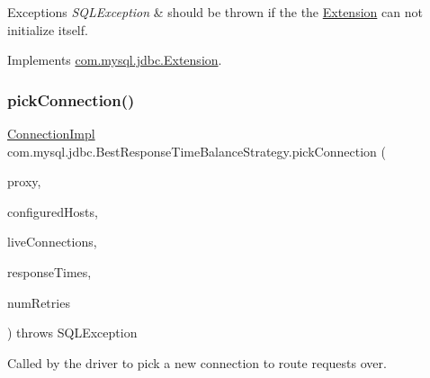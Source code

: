 \begin{DoxyExceptions}{Exceptions}
{\em S\+Q\+L\+Exception} & should be thrown if the the \mbox{\hyperlink{interfacecom_1_1mysql_1_1jdbc_1_1_extension}{Extension}} can not initialize itself. \\
\hline
\end{DoxyExceptions}


Implements \mbox{\hyperlink{interfacecom_1_1mysql_1_1jdbc_1_1_extension_a79427811058193260bd4df0c38414e88}{com.\+mysql.\+jdbc.\+Extension}}.

\mbox{\label{classcom_1_1mysql_1_1jdbc_1_1_best_response_time_balance_strategy_ad59590e6022784ddedcfb060173aed21}} 
\subsubsection{\texorpdfstring{pick\+Connection()}{pickConnection()}}
{\footnotesize\ttfamily \mbox{\hyperlink{classcom_1_1mysql_1_1jdbc_1_1_connection_impl}{Connection\+Impl}} com.\+mysql.\+jdbc.\+Best\+Response\+Time\+Balance\+Strategy.\+pick\+Connection (\begin{DoxyParamCaption}\item[{\mbox{\hyperlink{classcom_1_1mysql_1_1jdbc_1_1_load_balanced_connection_proxy}{Load\+Balanced\+Connection\+Proxy}}}]{proxy,  }\item[{List$<$ String $>$}]{configured\+Hosts,  }\item[{Map$<$ String, \mbox{\hyperlink{classcom_1_1mysql_1_1jdbc_1_1_connection_impl}{Connection\+Impl}} $>$}]{live\+Connections,  }\item[{long \mbox{[}$\,$\mbox{]}}]{response\+Times,  }\item[{int}]{num\+Retries }\end{DoxyParamCaption}) throws S\+Q\+L\+Exception}

Called by the driver to pick a new connection to route requests over.


